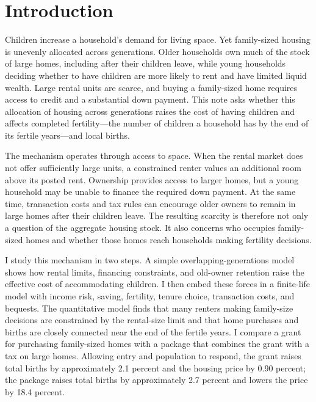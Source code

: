 \documentclass[11pt]{article}
\theoremstyle{definition}
\newcommand{\1}{\mathbf 1}
\begin{document}
\section{Introduction}
Children increase a household's demand for living space. Yet family-sized
housing is unevenly allocated across generations. Older households own much of
the stock of large homes, including after their children leave, while young
households deciding whether to have children are more likely to rent and have
limited liquid wealth. Large rental units are scarce, and buying a family-sized
home requires access to credit and a substantial down payment. This note asks
whether this allocation of housing across generations raises the cost of
having children and affects completed fertility---the number of children a
household has by the end of its fertile years---and local births.

The mechanism operates through access to space. When the rental market does
not offer sufficiently large units, a constrained renter values an additional
room above its posted rent. Ownership provides access to larger homes, but a
young household may be unable to finance the required down payment. At the
same time, transaction costs and tax rules can encourage older owners to remain
in large homes after their children leave. The resulting scarcity is therefore
not only a question of the aggregate housing stock. It also concerns who
occupies family-sized homes and whether those homes reach households making
fertility decisions.

I study this mechanism in two steps. A simple overlapping-generations model
shows how rental limits, financing constraints, and old-owner retention raise
the effective cost of accommodating children. I then embed these forces in a
finite-life model with income risk, saving, fertility, tenure choice,
transaction costs, and bequests. The quantitative model finds that many
renters making family-size decisions are constrained by the rental-size limit
and that home purchases and births are closely connected near the end of the
fertile years. I compare a grant for purchasing family-sized homes with a
package that combines the grant with a tax on large homes. Allowing entry and
population to respond, the grant raises total births by approximately 2.1
percent and the housing price by 0.90 percent; the package raises total births
by approximately 2.7 percent and lowers the price by 18.4 percent.
\end{document}

